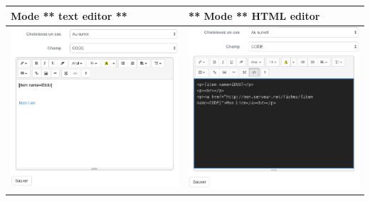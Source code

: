 \documentclass[letterpaper,10pt,english]{sphinxmanual}
\begin{document}
\begin{tabulary}{\linewidth}{|L|L|}
\hline

Mode ** text editor **
 & 
** Mode ** HTML editor
\\
\hline
\includegraphics[width=1.000\linewidth]{set-template-window.png}
 & 
\includegraphics[width=1.000\linewidth]{set-template-html-window.png}
\\
\hline\end{tabulary}
\end{document}
